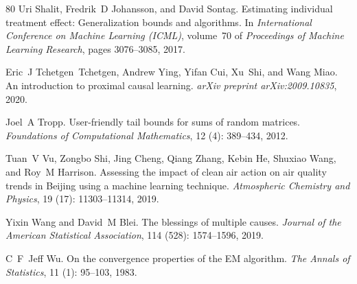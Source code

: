 \begin{thebibliography}{80}
Uri Shalit, Fredrik~D Johansson, and David Sontag.
\newblock Estimating individual treatment effect: Generalization bounds and algorithms.
\newblock In \emph{International Conference on Machine Learning (ICML)}, volume~70 of \emph{Proceedings of Machine Learning Research}, pages 3076--3085, 2017.

Eric~J Tchetgen~Tchetgen, Andrew Ying, Yifan Cui, Xu~Shi, and Wang Miao.
\newblock An introduction to proximal causal learning.
\newblock \emph{arXiv preprint arXiv:2009.10835}, 2020.

Joel~A Tropp.
\newblock User-friendly tail bounds for sums of random matrices.
\newblock \emph{Foundations of Computational Mathematics}, 12 (4): 389--434, 2012.

Tuan~V Vu, Zongbo Shi, Jing Cheng, Qiang Zhang, Kebin He, Shuxiao Wang, and Roy~M Harrison.
\newblock Assessing the impact of clean air action on air quality trends in {B}eijing using a machine learning technique.
\newblock \emph{Atmospheric Chemistry and Physics}, 19 (17): 11303--11314, 2019.
\newblock

Yixin Wang and David~M Blei.
\newblock The blessings of multiple causes.
\newblock \emph{Journal of the American Statistical Association}, 114 (528): 1574--1596, 2019.

C~F~Jeff Wu.
\newblock On the convergence properties of the {EM} algorithm.
\newblock \emph{The Annals of Statistics}, 11 (1): 95--103, 1983.
\end{thebibliography}
